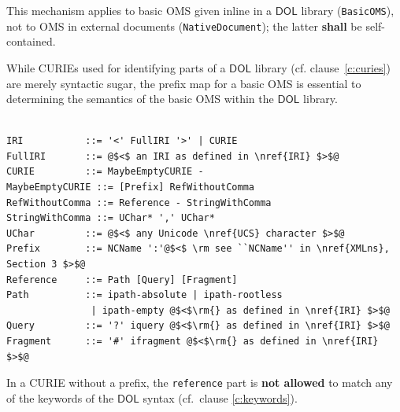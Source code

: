 \documentclass[10pt, a4paper]{isov2}
\makeatletter
\newcommand*{\cf}{cf.\@\xspace}
\newcommand*{\eg}{e.g.,\@\xspace}
\newcommand*\CommentAuthor{}
\renewcommand*\CommentAuthor{#1}}
\newcommand*\CommentDate{}
\renewcommand*\CommentDate{#1}}
\newcommand*\CommentId{}
\renewcommand*\CommentId{#1}}
\newcommand*\CommentType{}
\renewcommand*\CommentType{#1}}
\newcommand*{\SetCommentColorByType}[1]{%
\edef\localType{{#1}}%
\expandafter\ifstrequal\localType{q-aut}{\colorlet{CommentColor}{red}}{%
\expandafter\ifstrequal\localType{q-all}{\colorlet{CommentColor}{orange}}{%
\expandafter\ifstrequal\localType{todo}{\colorlet{CommentColor}{orange}}{%
\expandafter\ifstrequal\localType{fyi}{\colorlet{CommentColor}{lightgray}}{%
\colorlet{CommentColor}{yellow}}}}}}
\newcommand*{\SetCommentPrefixByType}[1]{%
\edef\localType{{#1}}%
\expandafter\@ifmtarg\localType{%
\edef\CommentPrefix{}%
}{%
\caseupper[q]{#1}%
\edef\CommentPrefix{\thestring: }%
}}
\newcommand*{\initComment}[1]{%
\setkeys{Comment}{#1}%
\SetCommentColorByType{\CommentType}%
\relax%
\SetCommentPrefixByType{\CommentType}%
\relax%
}
\newcommand*{\todonote}[2][]{%
\initComment{#1}%
\pdfcomment[author=\CommentAuthor,color=CommentColor,date=\CommentDate,id=\CommentId]{%
\CommentPrefix
#2}}
\renewcommand*{\todonote}[2][]{%
\initComment{#1}%
\ednote{\CommentPrefix #2}}
\newcommand*{\syntax}[1]{\texttt{#1}}
\newcommand*{\notallowed}{\textbf{not allowed}\xspace}
\newcommand*{\shall}{\textbf{shall}\xspace}
\newcommand*{\DOL}{\ensuremath{\mathsf{DOL}}\xspace}
\renewcommand{\clauserefname}{clause}
\renewcommand{\noterefname}{note}
\renewcommand{\cref}[1]{\clauserefname~\ref{#1}}
\renewcommand{\nref}[1]{\noterefname~\ref{#1}}
\renewcommand{\nref}[1]{\ref{nref-#1}}
\makeatother
\begin{document}
This mechanism applies to basic OMS given inline in a \DOL library (\syntax{BasicOMS}), not to OMS in external documents (\syntax{NativeDocument}); the latter \shall be self-contained.

While CURIEs used for identifying parts of a \DOL library (\cf \cref{c:curies}) are merely syntactic
sugar, the prefix map for a basic OMS is essential to determining the semantics of the basic OMS
within the \DOL library.



\label{c:curie-syntax}

\vspace{-1.4em}
\begin{lstlisting}[language=ebnf,escapeinside={@@}]

IRI           ::= '<' FullIRI '>' | CURIE
FullIRI       ::= @$<$ an IRI as defined in \nref{IRI} $>$@
CURIE         ::= MaybeEmptyCURIE -
MaybeEmptyCURIE ::= [Prefix] RefWithoutComma
RefWithoutComma ::= Reference - StringWithComma
StringWithComma ::= UChar* ',' UChar*
UChar         ::= @$<$ any Unicode \nref{UCS} character $>$@
Prefix        ::= NCName ':'@$<$ \rm see ``NCName'' in \nref{XMLns}, Section 3 $>$@
Reference     ::= Path [Query] [Fragment]
Path          ::= ipath-absolute | ipath-rootless 
               | ipath-empty @$<$\rm{} as defined in \nref{IRI} $>$@
Query         ::= '?' iquery @$<$\rm{} as defined in \nref{IRI} $>$@
Fragment      ::= '#' ifragment @$<$\rm{} as defined in \nref{IRI} $>$@
\end{lstlisting}


In a CURIE without a prefix, the \syntax{reference} part is \notallowed to match any of the keywords of the \DOL syntax (cf.\ clause \ref{c:keywords}).

\medspace








\end{document}
